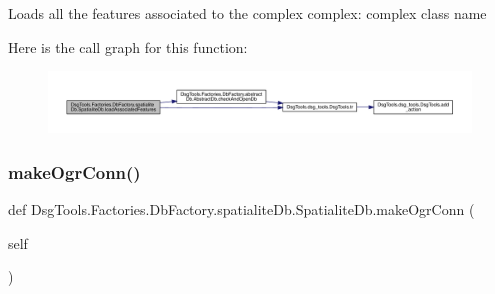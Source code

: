 \begin{DoxyVerb}Loads all the features associated to the complex 
complex: complex class name
\end{DoxyVerb}
 Here is the call graph for this function\+:
\nopagebreak
\begin{figure}[H]
\begin{center}
\leavevmode
\includegraphics[width=350pt]{class_dsg_tools_1_1_factories_1_1_db_factory_1_1spatialite_db_1_1_spatialite_db_a8dee410ae184376d36aceabc16ebe13c_cgraph}
\end{center}
\end{figure}
\mbox{\label{class_dsg_tools_1_1_factories_1_1_db_factory_1_1spatialite_db_1_1_spatialite_db_a90ac5680b7a302f0e6d99f21f7c48b40}} 
\subsubsection{\texorpdfstring{make\+Ogr\+Conn()}{makeOgrConn()}}
{\footnotesize\ttfamily def Dsg\+Tools.\+Factories.\+Db\+Factory.\+spatialite\+Db.\+Spatialite\+Db.\+make\+Ogr\+Conn (\begin{DoxyParamCaption}\item[{}]{self }\end{DoxyParamCaption})}

